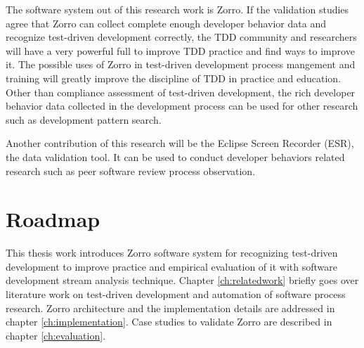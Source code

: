 The software system out of this research work is Zorro. If the validation
studies agree that Zorro can collect complete enough developer behavior
data and recognize test-driven development correctly, the TDD community and
researchers will have a very powerful full to improve TDD practice and find
ways to improve it. The possible uses of Zorro in test-driven development
process mangement and training will greatly improve the discipline of TDD
in practice and education. Other than compliance assessment of test-driven
development, the rich developer behavior data collected in the development
process can be used for other research such as development pattern
search.

Another contribution of this research will be the Eclipse Screen Recorder
(ESR), the data validation tool. It can be used to conduct developer
behaviors related research such as peer software review process observation.

\section{Roadmap}
This thesis work introduces Zorro software system for recognizing
test-driven development to improve practice and empirical evaluation of it
with software development stream analysis technique. Chapter
\ref{ch:relatedwork} briefly goes over literature work on test-driven
development and automation of software process research. Zorro architecture
and the implementation details are addressed in chapter
\ref{ch:implementation}. Case studies to validate Zorro are described in
chapter \ref{ch:evaluation}.

